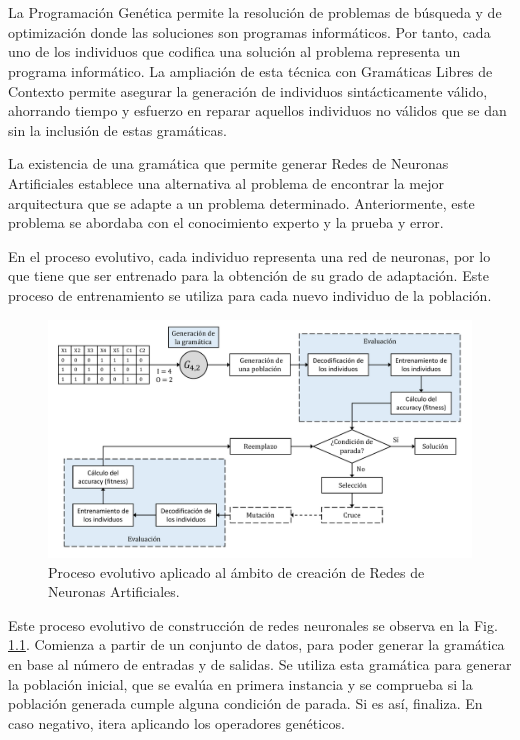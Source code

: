 \documentclass[spanish,a4paper,12pt,twoside]{report}
\begin{document}
  \chapter{\vspace{-3cm}{\LARGE 5. Planteamiento del problema}}
  \setcounter{figure}{14}
  \vspace{-1cm}
  La Programación Genética permite la resolución de problemas de búsqueda y de optimización donde las soluciones son programas informáticos. Por tanto, cada uno de los individuos que codifica una solución al problema representa un programa informático. La ampliación de esta técnica con Gramáticas Libres de Contexto permite asegurar la generación de individuos sintácticamente válido, ahorrando tiempo y esfuerzo en reparar aquellos individuos no válidos que se dan sin la inclusión de estas gramáticas. \par
  La existencia de una gramática que permite generar Redes de Neuronas Artificiales establece una alternativa al problema de encontrar la mejor arquitectura que se adapte a un problema determinado. Anteriormente, este problema se abordaba con el conocimiento experto y la prueba y error. \par
  En el proceso evolutivo, cada individuo representa una red de neuronas, por lo que tiene que ser entrenado para la obtención de su grado de adaptación. Este proceso de entrenamiento se utiliza para cada nuevo individuo de la población. \par
  \begin{figure}[H]
    \centering
    \includegraphics[width = 1\textwidth]{resources/Fig15.pdf}
    \caption{Proceso evolutivo aplicado al ámbito de creación de Redes de Neuronas Artificiales.}
    \label{fig:15}
  \end{figure} \par
  Este proceso evolutivo de construcción de redes neuronales se observa en la Fig. \ref{fig:15}. Comienza a partir de un conjunto de datos, para poder generar la gramática en base al número de entradas y de salidas. Se utiliza esta gramática para generar la población inicial, que se evalúa en primera instancia y se comprueba si la población generada cumple alguna condición de parada. Si es así, finaliza. En caso negativo, itera aplicando los operadores genéticos. \par
\end{document}
